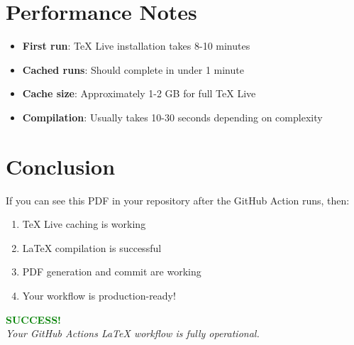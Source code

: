 \documentclass[12pt,a4paper]{article}
\begin{document}
\section{Performance Notes}

\begin{itemize}
    \item \textbf{First run}: TeX Live installation takes 8-10 minutes
    \item \textbf{Cached runs}: Should complete in under 1 minute
    \item \textbf{Cache size}: Approximately 1-2 GB for full TeX Live
    \item \textbf{Compilation}: Usually takes 10-30 seconds depending on complexity
\end{itemize}

\section{Conclusion}

If you can see this PDF in your repository after the GitHub Action runs, then:
\begin{enumerate}
    \item  TeX Live caching is working
    \item  LaTeX compilation is successful
    \item  PDF generation and commit are working
    \item  Your workflow is production-ready!
\end{enumerate}

\vspace{2cm}

\begin{center}
\textcolor{green}{\textbf{\Large SUCCESS!}}\\
\textit{Your GitHub Actions LaTeX workflow is fully operational.}
\end{center}
\end{document}
